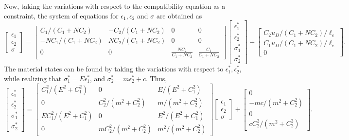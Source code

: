 \documentclass[10pt]{cas-sc}
\begin{document}
Now, taking the variations with respect to the compatibility equation as a constraint, the system of equations for $\epsilon_1,\epsilon_2$ and $\sigma$ are obtained as 
\begin{equation}
	\begin{bmatrix}
		\epsilon_1 \\
		\epsilon_2 \\
		\sigma
	\end{bmatrix}
	=
	\begin{bmatrix}
		C_1/(C_1+NC_2) & -C_2/(C_1+NC_2) & 0 & 0 \\
		-NC_1/(C_1+NC_2) & NC_2/(C_1+NC_2) & 0 & 0 \\
		0 & 0 & \frac{NC_2}{C_1+N C_2} & \frac{C_1}{C_1+N C_2}
	\end{bmatrix}
	\begin{bmatrix}
		\epsilon_1^* \\
		\epsilon_2^* \\
		\sigma_1^* \\
		\sigma_2^* 
	\end{bmatrix}
	+
	\begin{bmatrix}
		C_2 u_D/(C_1+NC_2)/\ell_e \\
		C_1 u_D/(C_1+NC_2)/\ell_e  \\
		0	
	\end{bmatrix}
	. \label{big_update_mech}
\end{equation}
The material states can be found by taking the variations with respect to $\epsilon_1^*, \epsilon_2^*$, while realizing that $\sigma_1^*=E\epsilon_1^*$, and $\sigma_2^*=m\epsilon_2^*+c$. Thus,
\begin{equation}
	\begin{bmatrix}
		\epsilon_1^* \\
		\epsilon_2^* \\
		\sigma_1^* \\
		\sigma_2^* 
	\end{bmatrix} 
	= 
	\begin{bmatrix}
		C_1^2/(E^2 + C_1^2) & 0 & E/(E^2 + C_1^2) \\
		0 & C_2^2/(m^2 + C_2^2)  & m/(m^2 + C_2^2) \\
		E C_1^2/(E^2 + C_1^2) & 0 & E^2/(E^2 + C_1^2)\\
		0 & mC_2^2/(m^2 + C_2^2)  & m^2/(m^2 + C_2^2) 
	\end{bmatrix} 
	\begin{bmatrix}
		\epsilon_1 \\
		\epsilon_2 \\
		\sigma
	\end{bmatrix} + 
	\begin{bmatrix}
		0 \\
		-mc/(m^2+C_2^2) \\
		0 \\
		cC_2^2/(m^2+C_2^2)
	\end{bmatrix} .\label{big_update_mat}
\end{equation}
\end{document}

